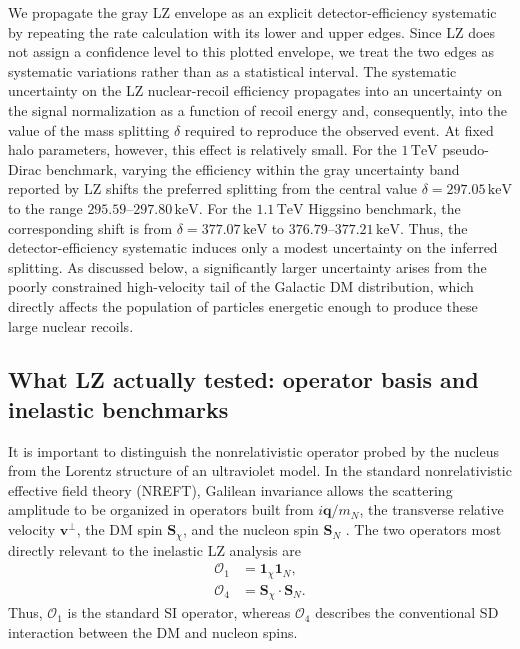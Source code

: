 \documentclass[aps,prd,reprint,superscriptaddress,nofootinbib,longbibliography,floatfix]{revtex4-2}
\newcommand{\TeV}{\mathrm{TeV}}
\newcommand{\keV}{\mathrm{keV}}
\begin{document}
We propagate the gray LZ envelope as an explicit detector-efficiency systematic by repeating the rate calculation with its lower and upper edges. Since LZ does not assign a confidence level to this plotted envelope, we treat the two edges as systematic variations rather than as a statistical interval. The systematic uncertainty on the LZ nuclear-recoil efficiency propagates into an uncertainty on the signal normalization as a function of recoil energy and, consequently, into the value of the mass splitting $\delta$ required to reproduce the observed event. At fixed halo parameters, however, this effect is relatively small. For the $1\,\TeV$ pseudo-Dirac benchmark, varying the efficiency within the gray uncertainty band reported by LZ shifts the preferred splitting from the central value $\delta=297.05\,\keV$ to the range $295.59$--$297.80\,\keV$. For the $1.1\,\TeV$ Higgsino benchmark, the corresponding shift is from $\delta=377.07\,\keV$ to $376.79$--$377.21\,\keV$. Thus, the detector-efficiency systematic induces only a modest uncertainty on the inferred splitting. As discussed below, a significantly larger uncertainty arises from the poorly constrained high-velocity tail of the Galactic DM distribution, which directly affects the population of particles energetic enough to produce these large nuclear recoils.

\subsection{What LZ actually tested: operator basis and inelastic benchmarks}
\label{sec:lzoperators}

It is important to distinguish the nonrelativistic operator probed by the nucleus from the Lorentz structure of an ultraviolet model. In the standard nonrelativistic effective field theory (NREFT), Galilean invariance allows the scattering amplitude to be organized in operators built from $i\bm q/m_N$, the transverse relative velocity $\bm v^{\perp}$, the DM spin $\bm S_\chi$, and the nucleon spin $\bm S_N$ \cite{Fitzpatrick2013,Anand2014}. The two operators most directly relevant to the inelastic LZ analysis are
\begin{align}
\mathcal{O}_1 &= \mathbf{1}_{\chi}\mathbf{1}_N,\\
\mathcal{O}_4 &= \bm S_\chi\cdot\bm S_N.
\end{align}
Thus, $\mathcal{O}_1$ is the standard SI operator, whereas $\mathcal{O}_4$ describes the conventional SD interaction between the DM and nucleon spins.
\end{document}
